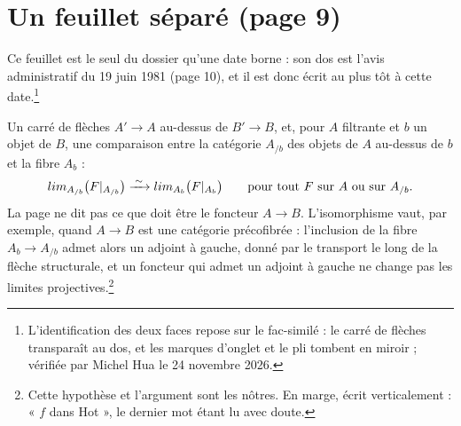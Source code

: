 \documentclass[11pt,a4paper]{article}
\begin{document}
\section*{Un feuillet séparé (page 9)}

Ce feuillet est le seul du dossier qu'une date borne : son dos est l'avis
administratif du 19 juin 1981 (page 10), et il est donc écrit au plus tôt à
cette date.\footnote{L'identification des deux faces repose sur le
fac-similé : le carré de flèches transparaît au dos, et les marques d'onglet et
le pli tombent en miroir ; vérifiée par Michel Hua le 24 novembre 2026.}

Un carré de flèches $A' \to A$ au-dessus de $B' \to B$, et, pour $A$ filtrante
et $b$ un objet de $B$, une comparaison entre la catégorie $A_{/b}$ des objets
de $A$ au-dessus de $b$ et la fibre $A_{b}$ :
\[
\varprojlim_{A_{/b}} \bigl(F|_{A_{/b}}\bigr) \xrightarrow{\;\sim\;}
\varprojlim_{A_{b}} \bigl(F|_{A_{b}}\bigr)
\qquad \text{pour tout $F$ sur $A$ ou sur $A_{/b}$.}
\]
La page ne dit pas ce que doit être le foncteur $A \to B$. L'isomorphisme vaut,
par exemple, quand $A \to B$ est une catégorie précofibrée : l'inclusion de la
fibre $A_{b} \to A_{/b}$ admet alors un adjoint à gauche, donné par le
transport le long de la flèche structurale, et un foncteur qui admet un adjoint
à gauche ne change pas les limites projectives.\footnote{Cette hypothèse et
l'argument sont les nôtres. En marge, écrit verticalement : « $f$ dans Hot »,
le dernier mot étant lu avec doute.}
\end{document}
